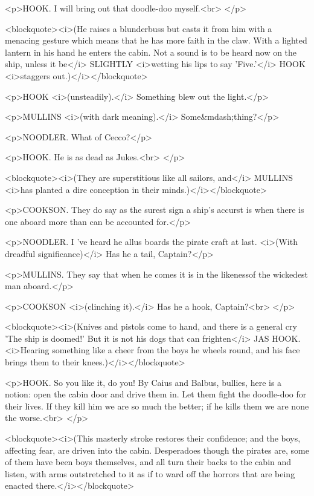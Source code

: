 <p>HOOK. I will bring out that doodle-doo myself.<br>
</p>

<blockquote><i>(He raises a blunderbuss but casts it from him with a
menacing gesture which means that he has more faith in the claw. With
a lighted lantern in his hand he enters the cabin. Not a sound is to
be heard now on the ship, unless it be</i> SLIGHTLY <i>wetting his
lips to say 'Five.'</i> HOOK <i>staggers out.)</i></blockquote>

<p>HOOK <i>(unsteadily).</i> Something blew out the light.</p>

<p>MULLINS <i>(with dark meaning).</i> Some&mdash;thing?</p>

<p>NOODLER. What of Cecco?</p>

<p>HOOK. He is as dead as Jukes.<br>
</p>

<blockquote><i>(They are superstitious like all sailors, and</i>
MULLINS <i>has planted a dire conception in their
minds.)</i></blockquote>

<p>COOKSON. They do say as the surest sign a ship's accurst is when
there is one aboard more than can be accounted for.</p>

<p>NOODLER. I 've heard he allus boards the pirate craft at last.
<i>(With dreadful significance)</i> Has he a tail, Captain?</p>

<p>MULLINS. They say that when he comes it is in the likenessof the
wickedest man aboard.</p>

<p>COOKSON <i>(clinching it).</i> Has he a hook, Captain?<br>
</p>

<blockquote><i>(Knives and pistols come to hand, and there is a
general cry 'The ship is doomed!' But it is not his dogs that can
frighten</i> JAS HOOK. <i>Hearing something like a cheer from the
boys he wheels round, and his face brings them to their
knees.)</i></blockquote>

<p>HOOK. So you like it, do you! By Caius and Balbus, bullies, here
is a notion: open the cabin door and drive them in. Let them fight
the doodle-doo for their lives. If they kill him we are so much the
better; if he kills them we are none the worse.<br>
</p>

<blockquote><i>(This masterly stroke restores their confidence; and
the boys, affecting fear, are driven into the cabin. Desperadoes
though the pirates are, some of them have been boys themselves, and
all turn their backs to the cabin and listen, with arms outstretched
to it as if to ward off the horrors that are being enacted
there.</i></blockquote>

